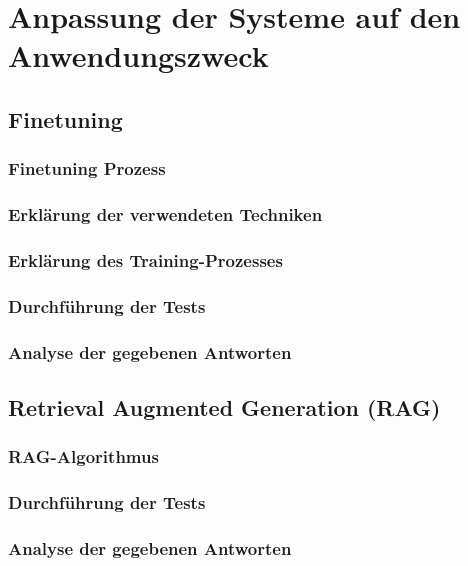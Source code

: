 \section{Anpassung der Systeme auf den Anwendungszweck}%

    \subsection{Finetuning}

        \subsubsection{Finetuning Prozess}%

        \subsubsection{Erklärung der verwendeten Techniken}%

        \subsubsection{Erklärung des Training-Prozesses}%

        \subsubsection{Durchführung der Tests}%

        \subsubsection{Analyse der gegebenen Antworten}%

    \subsection{Retrieval Augmented Generation (RAG)}%

        \subsubsection{RAG-Algorithmus}%

        \subsubsection{Durchführung der Tests}%

        \subsubsection{Analyse der gegebenen Antworten}%

